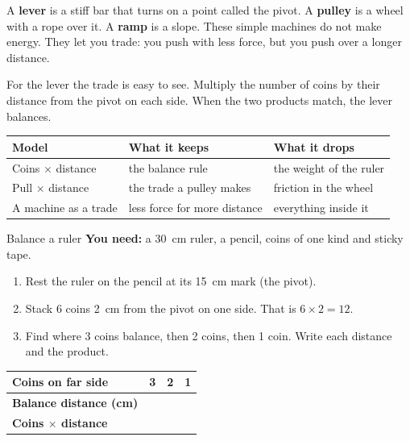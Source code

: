 \label{ch4}

A \textbf{lever} is a stiff bar that turns on a point called the pivot. A \textbf{pulley} is a wheel with a rope over it. A \textbf{ramp} is a slope. These simple machines do not make energy. They let you trade: you push with less force, but you push over a longer distance.

For the lever the trade is easy to see. Multiply the number of coins by their distance from the pivot on each side. When the two products match, the lever balances.

\begin{center}
\sffamily\small\renewcommand{\arraystretch}{1.5}
\begin{tabular}{@{}p{3.4cm}p{3.7cm}p{3.7cm}@{}}
\toprule
\textbf{Model} & \textbf{What it keeps} & \textbf{What it drops}\\
\midrule
Coins $\times$ distance & the balance rule & the weight of the ruler\\
Pull $\times$ distance & the trade a pulley makes & friction in the wheel\\
A machine as a trade & less force for more distance & everything inside it\\
\bottomrule
\end{tabular}
\end{center}

\begin{tryit}{Balance a ruler}
\textbf{You need:} a 30~cm ruler, a pencil, coins of one kind and sticky tape.
\begin{enumerate}[leftmargin=1.6em]
\item Rest the ruler on the pencil at its 15~cm mark (the pivot).
\item Stack 6 coins 2~cm from the pivot on one side. That is $6\times2=12$.
\item Find where 3 coins balance, then 2 coins, then 1 coin. Write each distance and the product.
\end{enumerate}
\par\medskip
\renewcommand{\arraystretch}{1.6}
\begin{tabular}{|l|c|c|c|}
\hline
\textbf{Coins on far side} & \textbf{3} & \textbf{2} & \textbf{1}\\ \hline
\textbf{Balance distance (cm)} & & & \\ \hline
\textbf{Coins $\times$ distance} & & & \\ \hline
\end{tabular}
\end{tryit}

